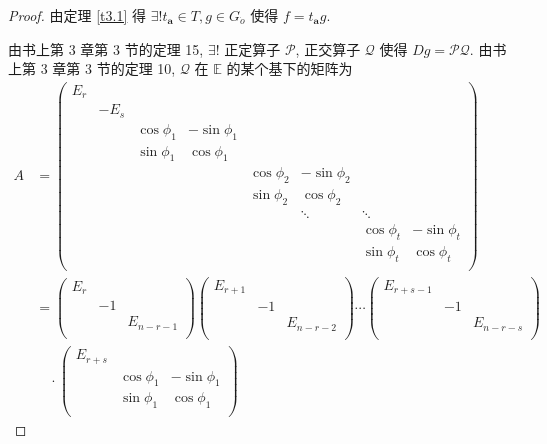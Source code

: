 \documentclass{ctexart}
\begin{document}
\begin{proof}
    由定理 \ref{t3.1} 得 $\exists!t_{\boldsymbol{a}}\in T,g\in G_{\dot{o}}$ 使得 $f=t_{\boldsymbol{a}}g$.

    由书上第 3 章第 3 节的定理 15, $\exists!$ 正定算子 $\mathcal{P}$, 正交算子 $\mathcal{Q}$ 使得 $Dg=\mathcal{PQ}$. 由书上第 3 章第 3 节的定理 10, $\mathcal{Q}$ 在 $\mathbb{E}$ 的某个基下的矩阵为
    \begin{align*}
        A & =\begin{pmatrix}
                E_r \\
                & -E_s \\
                && \cos\phi_1 & -\sin\phi_1 \\
                && \sin\phi_1 & \cos\phi_1 \\
                &&&& \cos\phi_2 & -\sin\phi_2 \\
                &&&& \sin\phi_2 & \cos\phi_2 \\
                &&&&& \ddots & \ddots \\
                &&&&&& \cos\phi_t & -\sin\phi_t \\
                &&&&&& \sin\phi_t & \cos\phi_t \\
            \end{pmatrix} \\
        & =\begin{pmatrix}
            E_r \\
            & -1 \\
            && E_{n-r-1} \\
        \end{pmatrix}\begin{pmatrix}
            E_{r+1} \\
            & -1 \\
            && E_{n-r-2} \\
        \end{pmatrix}\cdots\begin{pmatrix}
            E_{r+s-1} \\
            & -1 \\
            && E_{n-r-s} \\
        \end{pmatrix} \\
        & \quad\cdot\begin{pmatrix}
            E_{r+s} \\
            & \cos\phi_1 & -\sin\phi_1 \\
            & \sin\phi_1 & \cos\phi_1 \\

\end{pmatrix}
\end{align*}
\end{proof}
\end{document}
